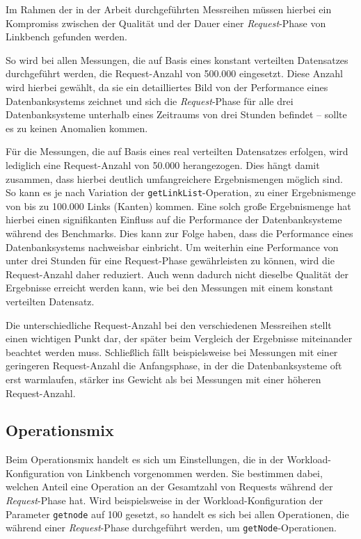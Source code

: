 Im Rahmen der in der Arbeit durchgeführten Messreihen müssen hierbei ein Kompromiss zwischen der Qualität und der Dauer einer \textit{Request}-Phase von Linkbench gefunden werden. 

So wird bei allen Messungen, die auf Basis eines konstant verteilten Datensatzes durchgeführt werden, die Request-Anzahl von 500.000 eingesetzt. Diese Anzahl wird hierbei gewählt, da sie ein detailliertes Bild von der Performance eines Datenbanksystems zeichnet und sich die \textit{Request}-Phase für alle drei Datenbanksysteme unterhalb eines Zeitraums von drei Stunden befindet -- sollte es zu keinen Anomalien kommen. 

Für die Messungen, die auf Basis eines real verteilten Datensatzes erfolgen, wird lediglich eine Request-Anzahl von 50.000 herangezogen. Dies hängt damit zusammen, dass hierbei deutlich umfangreichere Ergebnismengen möglich sind. So kann es je nach Variation der \texttt{getLinkList}-Operation, zu einer Ergebnismenge von bis zu 100.000 Links (Kanten) kommen. Eine solch große Ergebnismenge hat hierbei einen signifikanten Einfluss auf die Performance der Datenbanksysteme während des Benchmarks. Dies kann zur Folge haben, dass die Performance eines Datenbanksystems nachweisbar einbricht. Um weiterhin eine Performance von unter drei Stunden für eine Request-Phase gewährleisten zu können, wird die Request-Anzahl daher reduziert. Auch wenn dadurch nicht dieselbe Qualität der Ergebnisse erreicht werden kann, wie bei den Messungen mit einem konstant verteilten Datensatz.

Die unterschiedliche Request-Anzahl bei den verschiedenen Messreihen stellt einen wichtigen Punkt dar, der später beim Vergleich der Ergebnisse miteinander beachtet werden muss. Schließlich fällt beispielsweise bei Messungen mit einer geringeren Request-Anzahl die Anfangsphase, in der die Datenbanksysteme oft erst warmlaufen, stärker ins Gewicht als bei Messungen mit einer höheren Request-Anzahl.

\subsection{Operationsmix}
\label{analyse:linkbench:operationsmix}
Beim Operationsmix handelt es sich um Einstellungen, die in der Workload-Konfiguration von Linkbench vorgenommen werden. Sie bestimmen dabei, welchen Anteil eine Operation an der Gesamtzahl von Requests während der \textit{Request}-Phase hat. Wird beispielsweise in der Workload-Konfiguration der Parameter \texttt{getnode} auf 100 gesetzt, so handelt es sich bei allen Operationen, die während einer \textit{Request}-Phase durchgeführt werden, um \texttt{getNode}-Operationen.

